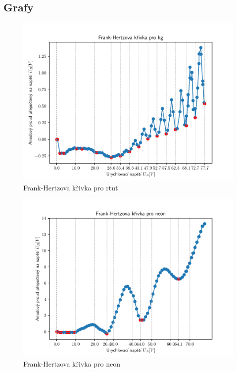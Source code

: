 \documentclass{article}
\begin{document}
\subsection{Grafy}
\begin{figure}[!h]
  \hspace*{-10em}
  \includegraphics[scale=1.2]{data/hg.pdf}
  \caption{Frank-Hertzova křivka pro rtuť}
\end{figure}
\begin{figure}[!h]
  \hspace*{-10em}
  \includegraphics[scale=1.2]{data/neon.pdf}
  \caption{Frank-Hertzova křivka pro neon}
\end{figure}
\newpage
\end{document}
